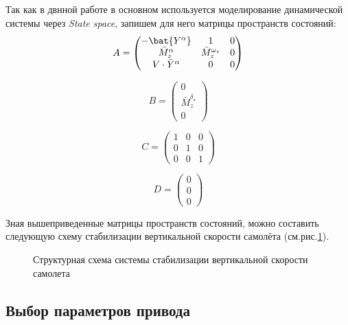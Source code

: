 Так как в двнной работе в основном используется моделирование динамической системы через \textit{State space}, запишем для него матрицы пространств состояний:
$$A = \begin{pmatrix}
-\bat{Y^{\alpha}} & 1 & 0\\ 
\bar{M}_z^\alpha & \bar{M}_z^{\omega_z} & 0\\ 
 V \cdot \bar{Y}^\alpha& 0 & 0 
\end{pmatrix}$$

$$B = \begin{pmatrix}
 0 \\ 
 \bar{M}_z^{\delta_{\text{э}}} \\ 
 0 
\end{pmatrix}$$

$$C= \begin{pmatrix}
1 & 0 & 0\\ 
0 & 1 & 0\\ 
 0& 0 &1 
\end{pmatrix}$$

$$D = \begin{pmatrix}
 0 \\ 
 0 \\ 
 0 
\end{pmatrix}$$

Зная вышеприведенные матрицы пространств состояний, можно составить следующую схему стабилизации вертикальной скорости самолёта (см.рис.\ref{fig:Схема}).


\begin{figure}[H]
    \caption{Структурная схема системы стабилизации вертикальной скорости самолета}
    \label{fig:Схема}
\end{figure}

\subsection{Выбор параметров привода}
    
